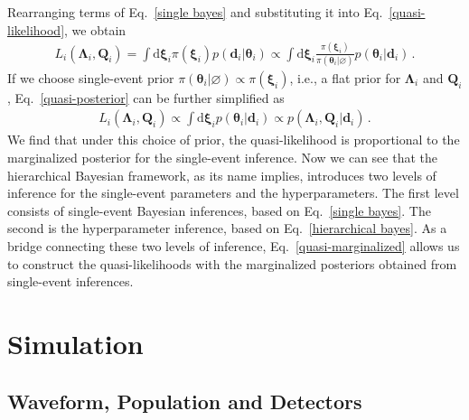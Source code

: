 \documentclass[a4paper,11pt]{article}
\begin{document}
Rearranging terms of Eq.~\eqref{single bayes} and substituting it into Eq.~\eqref{quasi-likelihood}, we obtain
\begin{equation}
\label{quasi-posterior}
\begin{aligned}
    L_i(\bm{\Lambda}_i,\bm{Q}_i) = \int \text{d}\bm{\xi}_i \pi(\bm{\xi}_i)p(\bm{d}_i|\bm{\theta}_i) \propto \int \text{d}\bm{\xi}_i \frac{\pi(\bm{\xi}_i)}{\pi(\bm{\theta}_i|\varnothing)}p(\bm{\theta}_i|\bm{d}_i)\,.
\end{aligned}  
\end{equation}
If we choose single-event prior $\pi(\bm{\theta}_i|\varnothing)\propto\pi(\bm{\xi}_i)$, 
i.e., a flat prior for $\bm{\Lambda}_i$ and $\bm{Q}_i$, Eq.~\eqref{quasi-posterior} can be further simplified as 
\begin{equation}
\label{quasi-marginalized}
\begin{aligned}
    L_i(\bm{\Lambda}_i,\bm{Q}_i) \propto \int \text{d}\bm{\xi}_i p(\bm{\theta}_i|\bm{d}_i)\propto p(\bm{\Lambda}_i,\bm{Q}_i|\bm{d}_i)\,.
\end{aligned}  
\end{equation}
We find that under this choice of prior, the quasi-likelihood is proportional to 
the marginalized posterior for the single-event inference. Now we can see that the 
hierarchical Bayesian framework, as its name implies, introduces two levels of 
inference for the single-event parameters and the hyperparameters. The first level 
consists of single-event Bayesian inferences, based on Eq.~\eqref{single bayes}. 
The second is the hyperparameter inference, based on Eq.~\eqref{hierarchical 
bayes}. As a bridge connecting these two levels of inference, Eq.~\eqref{quasi-marginalized} 
allows us to construct the quasi-likelihoods with the marginalized posteriors obtained from single-event inferences.

\section{Simulation}
\label{sec:simulation}

\subsection{Waveform, Population and Detectors}
\label{subsec:simulation_preliminaries}
\end{document}
